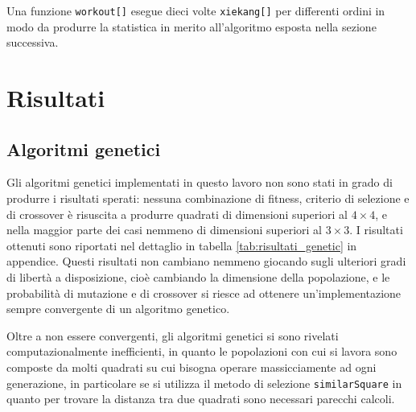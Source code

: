 \documentclass[italian,twoside,twocolumn]{article}
\begin{document}
Una funzione \texttt{workout[]} esegue dieci volte \texttt{xiekang[]} per differenti ordini in modo da produrre la statistica in merito all'algoritmo esposta nella sezione successiva.

\section{Risultati}

\subsection{Algoritmi genetici}
Gli algoritmi genetici implementati in questo lavoro non sono stati in grado di produrre i risultati sperati: nessuna combinazione di fitness, criterio di selezione e di crossover è risuscita a produrre quadrati di dimensioni superiori al $ 4\times 4 $, e nella maggior parte dei casi nemmeno di dimensioni superiori al $ 3\times 3 $. I risultati ottenuti sono riportati nel dettaglio in tabella \ref{tab:risultati_genetic} in appendice. Questi risultati non cambiano nemmeno giocando sugli ulteriori gradi di libertà a disposizione, cioè cambiando la dimensione della popolazione, e le probabilità di mutazione e di crossover si riesce ad ottenere un'implementazione sempre convergente di un algoritmo genetico. 

Oltre a non essere convergenti, gli algoritmi genetici si sono rivelati computazionalmente inefficienti, in quanto le popolazioni con cui si lavora sono composte da molti quadrati su cui bisogna operare massicciamente ad ogni generazione, in particolare se si utilizza il metodo di selezione \texttt{similarSquare} in quanto per trovare la distanza tra due quadrati sono necessari parecchi calcoli. 

\end{document}
